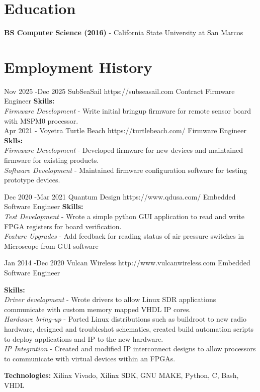 \documentclass[10pt]{article} %
\begin{document}
\section{Education}

\textbf{BS Computer Science (2016)} - California State University at San Marcos




\section{Employment History}

\job
{Nov 2025 -}{Dec 2025}
{SubSeaSail}
{https://subseasail.com}
{Contract Firmware Engineer}
{\textbf{Skills:}\\
\textit{Firmware Development} - Write initial bringup firmware for remote sensor board with MSPM0 processor. \\
}
\job
{Apr 2021 -}{}
{Voyetra Turtle Beach}
{https://turtlebeach.com/}
{Firmware Engineer}
{\textbf{Sklls:}\\
\textit{Firmware Development} - Developed firmware for new devices and maintained firmware for existing products. \\
\textit{Software Development} - Maintained firmware configuration software for testing prototype devices. \\
}

\job
{Dec 2020 -}{Mar 2021}
{Quantum Design}
{https://www.qdusa.com/}
{Embedded Software Engineer}
{\textbf{Skills:}\\
\textit{Test Development} - Wrote a simple python GUI application to read and write FPGA registers for board verification. \\
\textit{Feature Upgrades} - Add feedback for reading status of air pressure switches in Microscope from GUI software \\
}

\job
{Jan 2014 -}{Dec 2020}
{Vulcan Wireless}
{http://www.vulcanwireless.com}
{Embedded Software Engineer}
{\textbf{Skills:}\\
\textit{Driver development} - Wrote drivers to allow Linux SDR applications communicate with custom memory mapped VHDL IP cores. \\
\textit{Hardware bring-up} - Ported Linux distributions such as buildroot to new radio hardware, designed and troubleshot schematics, created build automation scripts to deploy applications and IP to the new hardware.\\
\textit{IP Integration} - Created and modified IP interconnect designs to allow processors to communicate with virtual devices within an FPGAs.\\
\rule{0mm}{5mm}\textbf{Technologies:} Xilinx Vivado, Xilinx SDK, GNU MAKE, Python, C, Bash, VHDL}
\end{document}
